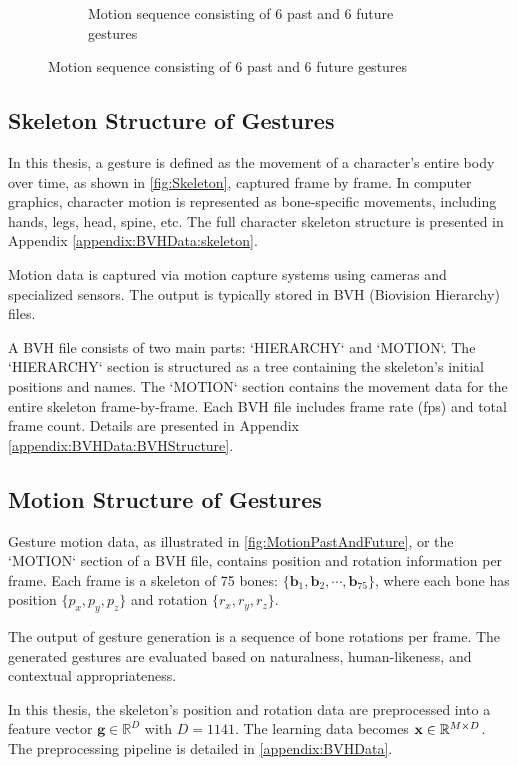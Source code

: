 \begin{figure}[H]
\begin{subfigure}{0.49\textwidth}
		\caption{\small Motion sequence consisting of 6 past and 6 future gestures}
		\label{fig:MotionPastAndFuture}
	\end{subfigure}
\end{figure}

\subsection{Skeleton Structure of Gestures}

In this thesis, a gesture is defined as the movement of a character's entire body over time, as shown in \autoref{fig:Skeleton}, captured frame by frame. In computer graphics, character motion is represented as bone-specific movements, including hands, legs, head, spine, etc. The full character skeleton structure is presented in Appendix \autoref{appendix:BVHData:skeleton}.

Motion data is captured via motion capture systems using cameras and specialized sensors. The output is typically stored in BVH (Biovision Hierarchy) files.

A BVH file consists of two main parts: `HIERARCHY` and `MOTION`. The `HIERARCHY` section is structured as a tree containing the skeleton’s initial positions and names. The `MOTION` section contains the movement data for the entire skeleton frame-by-frame. Each BVH file includes frame rate (fps) and total frame count. Details are presented in Appendix \autoref{appendix:BVHData:BVHStructure}.

\subsection{Motion Structure of Gestures}

Gesture motion data, as illustrated in \autoref{fig:MotionPastAndFuture}, or the `MOTION` section of a BVH file, contains position and rotation information per frame. Each frame is a skeleton of 75 bones: $\{ \textbf{b}_{1}, \textbf{b}_{2}, \cdots , \textbf{b}_{75} \}$, where each bone has position $\{ p_{x}, p_{y}, p_{z} \}$ and rotation $\{ r_{x}, r_{y}, r_{z} \}$.

The output of gesture generation is a sequence of bone rotations per frame. The generated gestures are evaluated based on naturalness, human-likeness, and contextual appropriateness.

In this thesis, the skeleton’s position and rotation data are preprocessed into a feature vector $\mathbf{g} \in \mathbb{R}^{D}$ with $D = 1141$. The learning data becomes $\mathbf{x} \in \mathbb{R}^{M \times D}$. The preprocessing pipeline is detailed in \autoref{appendix:BVHData}.

